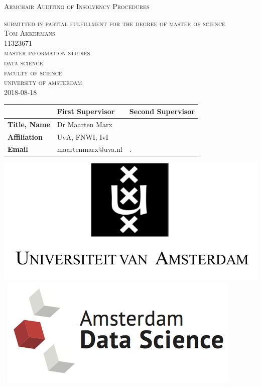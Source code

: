 \begin{titlepage}
\begin{center}

\textsc{\Large Armchair Auditing of Insolvency Procedures }

\bigskip

\textsc{\large
submitted in partial fulfillment for the degree of master of science\\
%
\bigskip
Tom Akkermans\\
%
11323671\\
%
\bigskip
master information studies\\
%
data science \\
%
faculty of science\\
%
university of amsterdam\\
%
\bigskip
2018-08-18
}

\end{center}
 

\vfill

\begin{center}
\begin{tabular}{|l||ll|}
\hline
 & \textbf{First Supervisor} & \textbf{Second Supervisor}  \\   
 \hline
\textbf{Title, Name} & Dr Maarten Marx&  \\
\textbf{Affiliation} &UvA, FNWI, IvI & \\ 
\textbf{Email} & maartenmarx@uva.nl& . \\
\hline
\end{tabular}
\end{center}

\bigskip

\begin{center}
\mbox{\includegraphics[width=.2\paperwidth]{logo-uva.png} 
\includegraphics[width=.2\paperwidth]{ads.png}
}
\end{center}
\end{titlepage}

%
%
%

